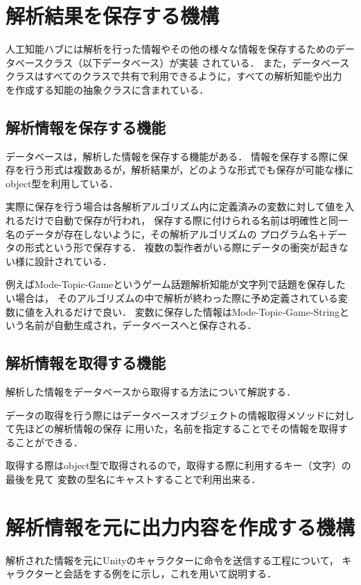 \newpage

\section{解析結果を保存する機構}
人工知能ハブには解析を行った情報やその他の様々な情報を保存するためのデータベースクラス（以下データベース）が実装
されている．
また，データベースクラスはすべてのクラスで共有で利用できるように，すべての解析知能や出力
を作成する知能の抽象クラスに含まれている．

\subsection{解析情報を保存する機能}
データベースは，解析した情報を保存する機能がある．
情報を保存する際に保存を行う形式は複数あるが，解析結果が，どのような形式でも保存が可能な様にobject型を利用している．

実際に保存を行う場合は各解析アルゴリズム内に定義済みの変数に対して値を入れるだけで自動で保存が行われ，
保存する際に付けられる名前は明確性と同一名のデータが存在しないように，その解析アルゴリズムの
プログラム名＋データの形式という形で保存する．
複数の製作者がいる際にデータの衝突が起きない様に設計されている．

例えばMode-Topic-Gameというゲーム話題解析知能が文字列で話題を保存したい場合は，
そのアルゴリズムの中で解析が終わった際に予め定義されている変数に値を入れるだけで良い．
変数に保存した情報はMode-Topic-Game-Stringという名前が自動生成され，データベースへと保存される．

\subsection{解析情報を取得する機能}
解析した情報をデータベースから取得する方法について解説する．

データの取得を行う際にはデータベースオブジェクトの情報取得メソッドに対して先ほどの解析情報の保存
に用いた，名前を指定することでその情報を取得することができる．

取得する際はobject型で取得されるので，取得する際に利用するキー（文字）の最後を見て
変数の型名にキャストすることで利用出来る．

\newpage

\section{解析情報を元に出力内容を作成する機構}
解析された情報を元にUnityのキャラクターに命令を送信する工程について，
キャラクターと会話をする例をに示し，これを用いて説明する．


